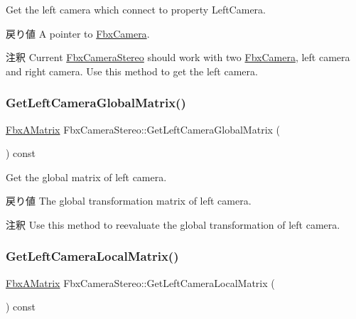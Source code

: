 Get the left camera which connect to property Left\+Camera. \begin{DoxyReturn}{戻り値}
A pointer to \hyperlink{class_fbx_camera}{Fbx\+Camera}. 
\end{DoxyReturn}
\begin{DoxyRemark}{注釈}
Current \hyperlink{class_fbx_camera_stereo}{Fbx\+Camera\+Stereo} should work with two \hyperlink{class_fbx_camera}{Fbx\+Camera}, left camera and right camera. Use this method to get the left camera. 
\end{DoxyRemark}
\mbox{\label{class_fbx_camera_stereo_afca8a70331c5a524ad7c790e8c52af77}} 
\subsubsection{\texorpdfstring{Get\+Left\+Camera\+Global\+Matrix()}{GetLeftCameraGlobalMatrix()}}
{\footnotesize\ttfamily \hyperlink{class_fbx_a_matrix}{Fbx\+A\+Matrix} Fbx\+Camera\+Stereo\+::\+Get\+Left\+Camera\+Global\+Matrix (\begin{DoxyParamCaption}{ }\end{DoxyParamCaption}) const}

Get the global matrix of left camera. \begin{DoxyReturn}{戻り値}
The global transformation matrix of left camera. 
\end{DoxyReturn}
\begin{DoxyRemark}{注釈}
Use this method to reevaluate the global transformation of left camera. 
\end{DoxyRemark}
\mbox{\label{class_fbx_camera_stereo_aba407c7661b66bc57690534a7aaf445e}} 
\subsubsection{\texorpdfstring{Get\+Left\+Camera\+Local\+Matrix()}{GetLeftCameraLocalMatrix()}}
{\footnotesize\ttfamily \hyperlink{class_fbx_a_matrix}{Fbx\+A\+Matrix} Fbx\+Camera\+Stereo\+::\+Get\+Left\+Camera\+Local\+Matrix (\begin{DoxyParamCaption}{ }\end{DoxyParamCaption}) const}

